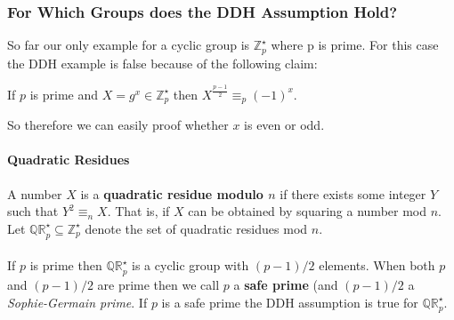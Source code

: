 \documentclass{article}
\begin{document}
\begin{adjustwidth}{2em}{2em}
\begin{adjustwidth}{2em}{2em}
				\subsubsection{For Which Groups does the DDH Assumption Hold?}
				\begin{adjustwidth}{2em}{1em}
					So far our only example for a cyclic group is $\mathbb{Z}_p^{\star}$ where p is prime. For this case the DDH example is false because of the following claim:
					\begin{center}
						If $p$ is prime and $X = g^{x} \in  \mathbb{Z}_p^{\star}$ then $X^{\frac{p-1}{2}} \equiv_p (-1)^{x}$.
					\end{center}
					So therefore we can easily proof whether $x$ is even or odd.
					\paragraph{Quadratic Residues}
					\begin{adjustwidth}{2em}{}
						A number $X$ is a \textbf{quadratic residue modulo $n$} if there exists some integer $Y$ such that $Y^2 \equiv_n X$. That is, if $X$ can be obtained by squaring a number mod $n$. Let $\mathbb{QR}_p^{\star} \subseteq \mathbb{Z}_p^{\star}$ denote the set of quadratic residues mod $n$. \\
						\hfill \\
						If $p$ is prime then $\mathbb{QR}_p^{\star}$ is a cyclic group with $(p-1)/2$ elements. When both $p$ and $(p-1)/2$ are prime then we call $p$ a \textbf{safe prime} (and $(p-1)/2$ a \textit{Sophie-Germain prime}. If $p$ is a safe prime the DDH assumption is true for $\mathbb{QR}_p^{\star}$.
					\end{adjustwidth}
				\end{adjustwidth}
			\end{adjustwidth}
		\end{adjustwidth}
		\newpage
\end{document}
